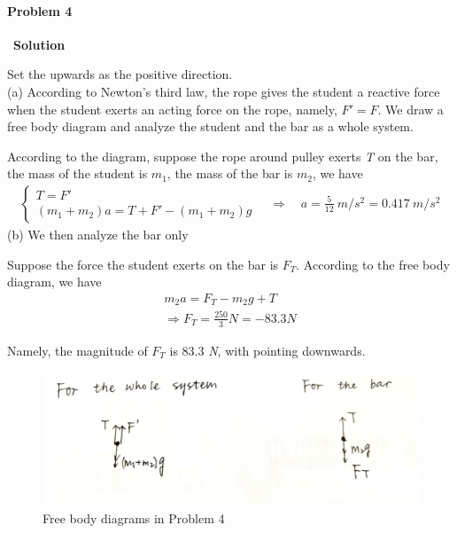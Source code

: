 \documentclass[12pt,a4paper]{article}
\begin{document}
\paragraph{\large \textbf{Problem 4}}~{\textbf{Solution}}
\vspace{2mm}
\par Set the upwards as the positive direction.\\
\noindent (a) According to Newton's third law, the rope gives the student a reactive force when the student exerts an acting force on the rope, namely, $F' = F$. We draw a free body diagram and analyze the student and the bar as a whole system.
\par According to the diagram, suppose the rope around pulley exerts \textit{T} on the bar, the mass of the student is $m_1$, the mass of the bar is $m_2$, we have
\begin{align*}
	\left\{ \begin{array}{c}
		T = F'\\
		(m_1 + m_2) a = T + F' - (m_1 + m_2)g
	\end{array} \right.	
	\quad \Rightarrow \quad
	a = \frac{5}{12}\ m/s^2 = 0.417\ m/s^2
\end{align*}
\noindent (b) We then analyze the bar only
\par Suppose the force the student exerts on the bar is $F_T$. According to the free body diagram, we have
\begin{align*}
	m_2a = F_T - m_2g + T\\
\Rightarrow
	F_T = \frac{250}{3} N = -83.3 N
\end{align*}
\par Namely, the magnitude of $F_T$ is 83.3 \textit{N}, with pointing downwards.
\begin{figure}[H]
    \centering
    \includegraphics[height = 4cm]{6.jpg}
    \caption{Free body diagrams in Problem 4}
\end{figure}
\end{document}
